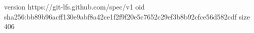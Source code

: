version https://git-lfs.github.com/spec/v1
oid sha256:bb89b96acff130e9abf8a42ce1f2f9f20e5c7652c29ef3b8b92cfce56d582cdf
size 406
